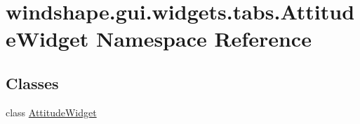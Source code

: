 \hypertarget{namespacewindshape_1_1gui_1_1widgets_1_1tabs_1_1_attitude_widget}{}\section{windshape.\+gui.\+widgets.\+tabs.\+Attitude\+Widget Namespace Reference}
\label{namespacewindshape_1_1gui_1_1widgets_1_1tabs_1_1_attitude_widget}
\subsection*{Classes}
\begin{DoxyCompactItemize}
\item 
class \mbox{\hyperlink{classwindshape_1_1gui_1_1widgets_1_1tabs_1_1_attitude_widget_1_1_attitude_widget}{Attitude\+Widget}}
\end{DoxyCompactItemize}
